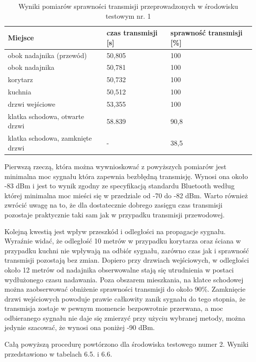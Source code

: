 \documentclass[12pt, twoside, openany]{mwrep}
\begin{document}
\begin{table}[H]
\begin{tabular}{|l|l|l|}
\hline
Miejsce                          & czas transmisji {[}s{]} & sprawność transmisji {[}\%{]} \\ \hline
obok nadajnika (przewód)         & 50,805                  & 100                           \\ \hline
obok nadajnika                   & 50,781                  & 100                           \\ \hline
korytarz                         & 50,732                  & 100                           \\ \hline
kuchnia                          & 50,512                  & 100                           \\ \hline
drzwi wejściowe                  & 53,355                  & 100                           \\ \hline
klatka schodowa, otwarte drzwi   & 58.839                  & 90,8                          \\ \hline
klatka schodowa, zamknięte drzwi & -                       & 38,5                          \\ \hline
\end{tabular}
\caption{Wyniki pomiarów sprawności transmisji przeprowadzonych w środowisku testowym nr. 1}
\end{table}
\par
Pierwszą rzeczą, która można wywnioskować z powyższych pomiarów jest minimalna moc sygnału która zapewnia bezbłędną transmisję. Wynosi ona około -83 dBm i jest to wynik zgodny ze specyfikacją standardu Bluetooth według której minimalna moc mieści się w przedziale od -70 do -82 dBm.  Warto również zwrócić uwagę na to, że dla dostatecznie dobrego zasięgu czas transmisji pozostaje praktycznie taki sam jak w przypadku transmisji przewodowej. 
\par
Kolejną kwestią jest wpływ przeszkód i odległości na propagacje sygnału. Wyraźnie widać, że odległość 10 metrów w przypadku korytarza oraz ściana w przypadku kuchni nie wpływają na odbiór sygnału, zarówno czas jak i sprawność transmisji pozostają bez zmian. Dopiero przy drzwiach wejściowych, w odległości około 12 metrów od nadajnika obserwowalne stają się utrudnienia w postaci wydłużonego czasu nadawania. Poza obszarem mieszkania, na klatce schodowej można zaobserwować obniżenie sprawności transmisji do około 90\%. Zamknięcie drzwi wejściowych powoduje prawie całkowity zanik sygnału do tego stopnia, że transmisja zostaje w pewnym momencie bezpowrotnie przerwana, a moc odbieranego sygnału nie daje się zmierzyć przy użyciu wybranej metody, można jedynie szacować, że wynosi ona poniżej -90 dBm.
\par
Całą powyższą procedurę powtórzono dla środowiska testowego numer 2. Wyniki przedstawiono w tabelach 6.5. i 6.6.
\end{document}
